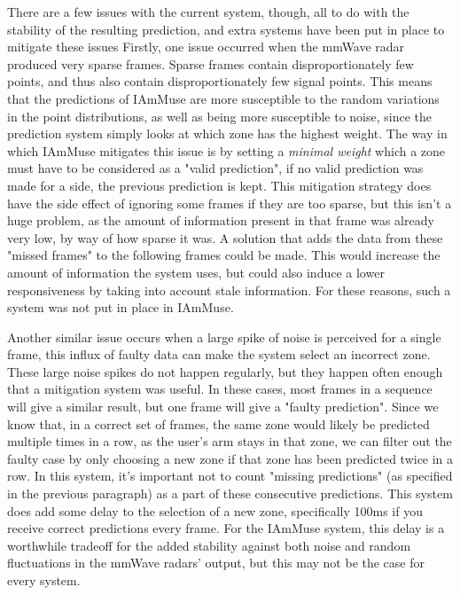 There are a few issues with the current system, though, all to do with the stability of the resulting prediction, and extra systems have been put in place to mitigate these issues
Firstly, one issue occurred when the mmWave radar produced very sparse frames. 
Sparse frames contain disproportionately few points, and thus also contain disproportionately few signal points. 
This means that the predictions of IAmMuse are more susceptible to the random variations in the point distributions, as well as being more susceptible to noise, since the prediction system simply looks at which zone has the highest weight.
The way in which IAmMuse mitigates this issue is by setting a \textit{minimal weight} which a zone must have to be considered as a "valid prediction", if no valid prediction was made for a side, the previous prediction is kept.
This mitigation strategy does have the side effect of ignoring some frames if they are too sparse, but this isn't a huge problem, as the amount of information present in that frame was already very low, by way of how sparse it was.
A solution that adds the data from these "missed frames" to the following frames could be made.
This would increase the amount of information the system uses, but could also induce a lower responsiveness by taking into account stale information.
For these reasons, such a system was not put in place in IAmMuse.


Another similar issue occurs when a large spike of noise is perceived for a single frame, this influx of faulty data can make the system select an incorrect zone.
These large noise spikes do not happen regularly, but they happen often enough that a mitigation system was useful.
In these cases, most frames in a sequence will give a similar result, but one frame will give a "faulty prediction".
Since we know that, in a correct set of frames, the same zone would likely be predicted multiple times in a row, as the user's arm stays in that zone, we can filter out the faulty case by only choosing a new zone if that zone has been predicted twice in a row.
In this system, it's important not to count "missing predictions" (as specified in the previous paragraph) as a part of these consecutive predictions.
This system does add some delay to the selection of a new zone, specifically 100ms if you receive correct predictions every frame. 
For the IAmMuse system, this delay is a worthwhile tradeoff for the added stability against both noise and random fluctuations in the mmWave radars' output, but this may not be the case for every system.

